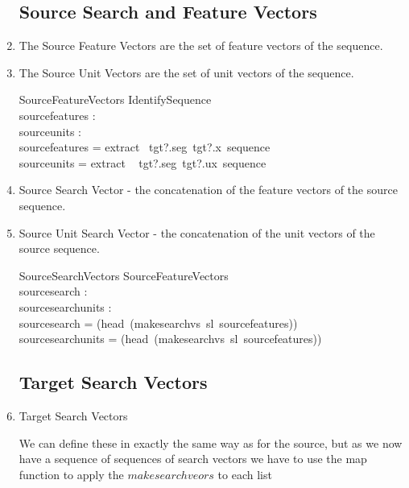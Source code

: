 \documentclass[11pt]{article}
\begin{document}
\begin{enumerate}
\subsection{Source Search and Feature Vectors}

\item The \textsf{Source Feature Vectors} are the set of feature vectors of the sequence. 

\item The \textsf{Source Unit Vectors} are the set of unit vectors of the sequence. 

\begin{schema}{SourceFeatureVectors}
	IdentifySequence  					\\
	sourcefeatures :  \seq \V   		\\
	sourceunits : \seq \U 			\\
\where
	sourcefeatures =  extract ~tgt?.seg~tgt?.x~sequence \\  
	sourceunits =  extract ~ tgt?.seg~tgt?.ux~sequence  \\  
\end{schema}

\item \textsf{Source Search Vector} - the concatenation of the feature vectors of the source sequence.

\item \textsf{Source Unit Search Vector} - the concatenation of the unit vectors of the source sequence.

\begin{schema}{SourceSearchVectors}
	SourceFeatureVectors 			\\
	sourcesearch : \Vdsl			\\
	sourcesearchunits : \Vsl			\\
\where
	sourcesearch = (head~(makesearchvs~sl~sourcefeatures)) \\
	sourcesearchunits = (head~(makesearchvs~sl~sourcefeatures)) \\
\end{schema}

\subsection{Target Search Vectors}

\item \textsf{Target Search Vectors}

We can define these in exactly the same way as for the source, but as we now have a sequence of sequences of search vectors we have to use the map function to apply the $makesearchveors$ to each list


\end{enumerate}
\end{document}
